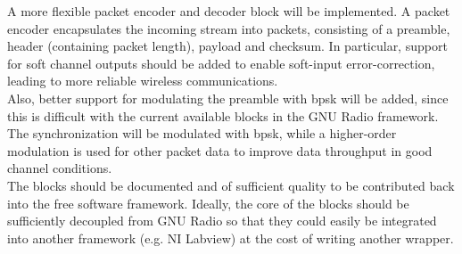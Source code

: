 \documentclass[12pt,english]{TCLsem}
\begin{document}
A more flexible packet encoder and decoder block will be implemented. A packet encoder encapsulates the incoming stream into packets, consisting of a preamble, header (containing packet length), payload and checksum. In particular, support for soft channel outputs should be added to enable soft-input error-correction, leading to more reliable wireless communications. \\

Also, better support for modulating the preamble with \gls{bpsk} will be added, since this is difficult with the current available blocks in the GNU Radio framework. The synchronization will be modulated with \gls{bpsk}, while a higher-order modulation is used for other packet data to improve data throughput in good channel conditions. \\

The blocks should be documented and of sufficient quality to be contributed back into the free software framework. Ideally, the core of the blocks should be sufficiently decoupled from GNU Radio so that they could easily be integrated into another framework (e.g. NI Labview) at the cost of writing another wrapper.
\end{document}
